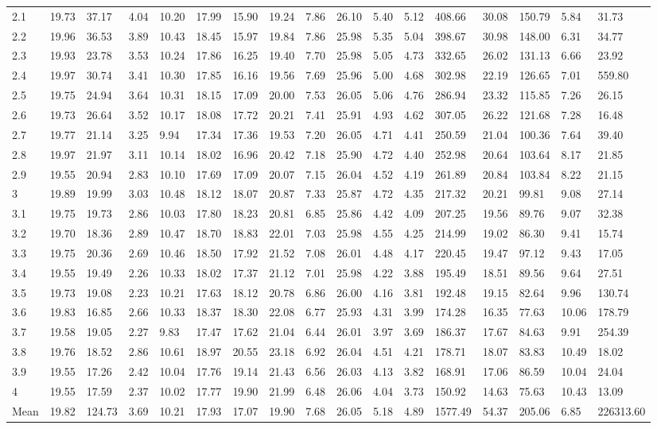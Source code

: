 \begin{adjustbox}{angle=90}
\begin{center}
\begin{tabular}{|l|llllllllllllllll|}
2.1&19.73&37.17&4.04&10.20&17.99&15.90&19.24&7.86&26.10&5.40&5.12&408.66&30.08&150.79&5.84&31.73  \\ 
2.2&19.96&36.53&3.89&10.43&18.45&15.97&19.84&7.86&25.98&5.35&5.04&398.67&30.98&148.00&6.31&34.77  \\ 
2.3&19.93&23.78&3.53&10.24&17.86&16.25&19.40&7.70&25.98&5.05&4.73&332.65&26.02&131.13&6.66&23.92  \\ 
2.4&19.97&30.74&3.41&10.30&17.85&16.16&19.56&7.69&25.96&5.00&4.68&302.98&22.19&126.65&7.01&559.80  \\ 
2.5&19.75&24.94&3.64&10.31&18.15&17.09&20.00&7.53&26.05&5.06&4.76&286.94&23.32&115.85&7.26&26.15  \\ 
2.6&19.73&26.64&3.52&10.17&18.08&17.72&20.21&7.41&25.91&4.93&4.62&307.05&26.22&121.68&7.28&16.48  \\ 
2.7&19.77&21.14&3.25&9.94&17.34&17.36&19.53&7.20&26.05&4.71&4.41&250.59&21.04&100.36&7.64&39.40  \\ 
2.8&19.97&21.97&3.11&10.14&18.02&16.96&20.42&7.18&25.90&4.72&4.40&252.98&20.64&103.64&8.17&21.85  \\ 
2.9&19.55&20.94&2.83&10.10&17.69&17.09&20.07&7.15&26.04&4.52&4.19&261.89&20.84&103.84&8.22&21.15  \\ 
3&19.89&19.99&3.03&10.48&18.12&18.07&20.87&7.33&25.87&4.72&4.35&217.32&20.21&99.81&9.08&27.14  \\ 
3.1&19.75&19.73&2.86&10.03&17.80&18.23&20.81&6.85&25.86&4.42&4.09&207.25&19.56&89.76&9.07&32.38  \\ 
3.2&19.70&18.36&2.89&10.47&18.70&18.83&22.01&7.03&25.98&4.55&4.25&214.99&19.02&86.30&9.41&15.74  \\ 
3.3&19.75&20.36&2.69&10.46&18.50&17.92&21.52&7.08&26.01&4.48&4.17&220.45&19.47&97.12&9.43&17.05  \\ 
3.4&19.55&19.49&2.26&10.33&18.02&17.37&21.12&7.01&25.98&4.22&3.88&195.49&18.51&89.56&9.64&27.51  \\ 
3.5&19.73&19.08&2.23&10.21&17.63&18.12&20.78&6.86&26.00&4.16&3.81&192.48&19.15&82.64&9.96&130.74  \\ 
3.6&19.83&16.85&2.66&10.33&18.37&18.30&22.08&6.77&25.93&4.31&3.99&174.28&16.35&77.63&10.06&178.79  \\ 
3.7&19.58&19.05&2.27&9.83&17.47&17.62&21.04&6.44&26.01&3.97&3.69&186.37&17.67&84.63&9.91&254.39  \\ 
3.8&19.76&18.52&2.86&10.61&18.97&20.55&23.18&6.92&26.04&4.51&4.21&178.71&18.07&83.83&10.49&18.02  \\ 
3.9&19.55&17.26&2.42&10.04&17.76&19.14&21.43&6.56&26.03&4.13&3.82&168.91&17.06&86.59&10.04&24.04  \\ 
4&19.55&17.59&2.37&10.02&17.77&19.90&21.99&6.48&26.06&4.04&3.73&150.92&14.63&75.63&10.43&13.09  \\ \hline \hline
Mean&19.82&124.73&3.69&10.21&17.93&17.07&19.90&7.68&26.05&5.18&4.89&1577.49&54.37&205.06&6.85&226313.60  \\ \hline
\end{tabular}
\end{center}
\end{adjustbox}





